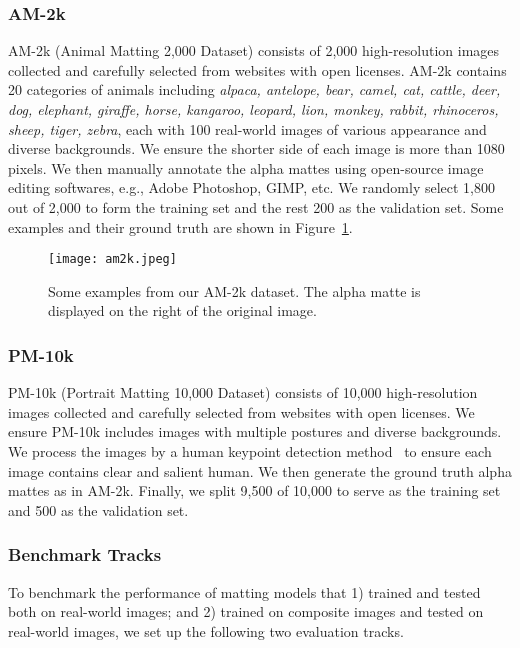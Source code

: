 \documentclass[twocolumn]{svjour3}
\begin{document}
\subsubsection{AM-2k}
AM-2k (Animal Matting 2,000 Dataset) consists of 2,000 high-resolution images collected and carefully selected from websites with open licenses. AM-2k contains 20 categories of animals including \textit{alpaca, antelope, bear, camel, cat, cattle, deer, dog, elephant, giraffe, horse, kangaroo, leopard, lion, monkey, rabbit, rhinoceros, sheep, tiger, zebra}, each with 100 real-world images of various appearance and diverse backgrounds. We ensure the shorter side of each image is more than 1080 pixels. We then manually annotate the alpha mattes using open-source image editing softwares, e.g., Adobe Photoshop, GIMP, etc. We randomly select 1,800 out of 2,000 to form the training set and the rest 200 as the validation set. Some examples and their ground truth are shown in Figure~\ref{fig:am2k_examples}. 

\begin{figure}[htb]
    \centering
    \texttt{[image: am2k.jpeg]}
     \caption{Some examples from our AM-2k dataset. The alpha matte is displayed on the right of the original image.}
    \label{fig:am2k_examples}
\end{figure}

\subsubsection{PM-10k} PM-10k (Portrait Matting 10,000 Dataset) consists of 10,000 high-resolution images collected and carefully selected from websites with open licenses. We ensure PM-10k includes images with multiple postures and diverse backgrounds. We process the images by a human keypoint detection method~\citep{zhang2021towards} to ensure each image contains clear and salient human. We then generate the ground truth alpha mattes as in AM-2k. Finally, we split 9,500 of 10,000 to serve as the training set and 500 as the validation set. 

\subsubsection{Benchmark Tracks}
To benchmark the performance of matting models that 1) trained and tested both on real-world images; and 2) trained on composite images and tested on real-world images, we set up the following two evaluation tracks.
\end{document}
